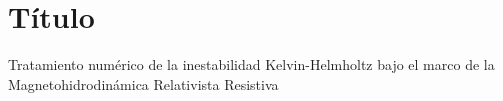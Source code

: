 \section{Título}
\noindent Tratamiento numérico de la inestabilidad Kelvin-Helmholtz bajo el marco de la Magnetohidrodinámica Relativista Resistiva